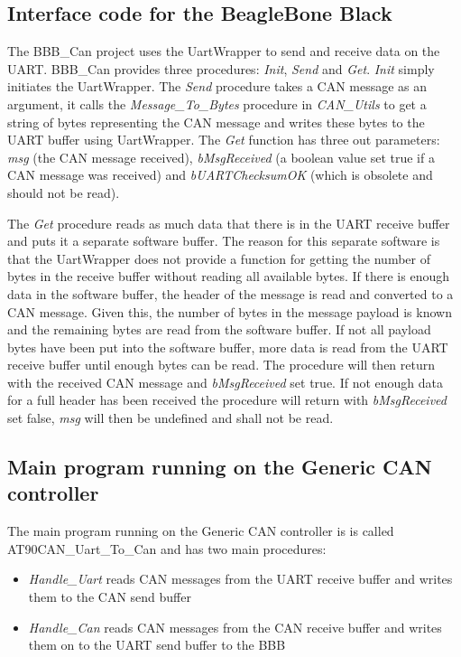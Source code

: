 \subsection{Interface code for the BeagleBone Black}
The BBB\_Can project uses the UartWrapper to send and receive data on the UART. BBB\_Can provides three procedures: \emph{Init}, \emph{Send} and \emph{Get}. \newline
\emph{Init} simply initiates the UartWrapper. \newline
The \emph{Send} procedure takes a CAN message as an argument, it calls the \emph{Message\_To\_Bytes} procedure in \emph{CAN\_Utils} to get a string of bytes representing the CAN message and writes these bytes to the UART buffer using UartWrapper. \newline
The \emph{Get} function has three out parameters: \emph{msg} (the CAN message received), \emph{bMsgReceived} (a boolean value set true if a CAN message was received) and \emph{bUARTChecksumOK} (which is obsolete and should not be read). 

The \emph{Get} procedure reads as much data that there is in the UART receive buffer and puts it a separate software buffer. The reason for this separate software is that the UartWrapper does not provide a function for getting the number of bytes in the receive buffer without reading all available bytes. \newline
If there is enough data in the software buffer, the header of the message is read and converted to a CAN message. Given this, the number of bytes in the message payload is known and the remaining bytes are read from the software buffer. If not all payload bytes have been put into the software buffer, more data is read from the UART receive buffer until enough bytes can be read. The procedure will then return with the received CAN message and \emph{bMsgReceived} set true. \newline
If not enough data for a full header has been received the procedure will return with \emph{bMsgReceived} set false, \emph{msg} will then be undefined and shall not be read.


\subsection{Main program running on the Generic CAN controller}
The main program running on the Generic CAN controller is is called AT90CAN\_Uart\_To\_Can and has two main procedures:

\begin{itemize}
   \item { \em Handle\_Uart}
   reads CAN messages from the UART receive buffer and writes them to the CAN send buffer
   \item { \em Handle\_Can}
   reads CAN messages from the CAN receive buffer and writes them on to the UART send buffer to the BBB
\end{itemize}

